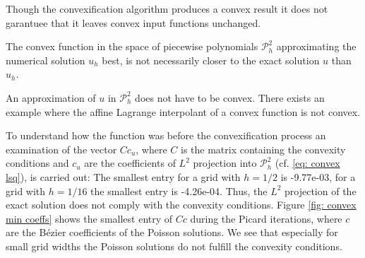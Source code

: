 Though the convexification algorithm produces a convex result it does not garantuee that it leaves convex input functions unchanged.

The convex function in the space of piecewise polynomials $\mathcal P^2_h$ approximating the numerical solution $u_h$ best, is not necessarily closer to the exact solution $u$ than $u_h$. %

An approximation of $u$ in $\mathcal P^2_h$ does not have to be convex. There exists an example where the affine Lagrange interpolant of a convex function is not convex\cite[p.3142]{AM2009}. 

To understand how  the function was before the convexification process an examination of the vector $Cc_u$, where $C$ is the matrix containing the convexity conditions and $c_u$ are the coefficients of $L^2$ projection into $\mathcal P^2_h$ (cf. \eqref{eq: convex lsq}), is carried out: The smallest entry for a grid with $h=1/2$ is -9.77e-03, for a grid with $h=1/16$ the smallest entry is -4.26e-04. Thus, the $L^2$ projection of the exact solution does not comply with the convexity conditions.
Figure \ref{fig: convex min coeffs} shows the smallest entry of $Cc$ during the Picard iterations, where $c$ are the B\'ezier coefficients of the Poisson solutions. We see that especially for small grid widths the Poisson solutions do not fulfill the convexity conditions. 

